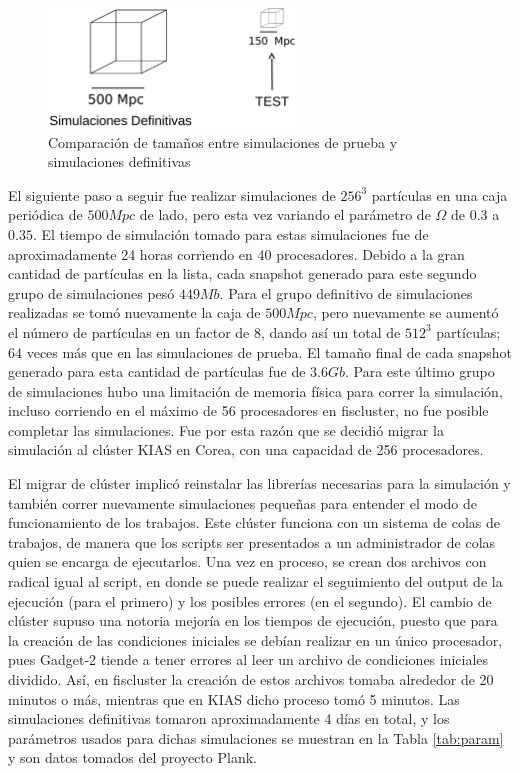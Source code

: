 \begin{figure}
	\centering
	\includegraphics[width=0.6\textwidth]{Trabajo/escala}
	\caption{Comparación de tamaños entre simulaciones de prueba y simulaciones definitivas}
	\label{fig:escala}
\end{figure}

El siguiente paso a seguir fue realizar simulaciones de $256^3$ partículas en una caja periódica de $500Mpc$ de lado, pero esta vez variando el parámetro de $\Omega$ de $0.3$ a $0.35$. El tiempo de simulación tomado para estas simulaciones fue de aproximadamente 24 horas corriendo en 40 procesadores. Debido a la gran cantidad de partículas en la lista, cada snapshot generado para este segundo grupo de simulaciones pesó $449Mb$. Para el grupo definitivo de simulaciones realizadas se tomó nuevamente la caja de $500Mpc$, pero nuevamente se aumentó el número de partículas en un factor de 8, dando así un total de $512^3$ partículas; $64$ veces más que en las simulaciones de prueba. El tamaño final de cada snapshot generado para esta cantidad de partículas fue de $3.6Gb$. Para este último grupo de simulaciones hubo una limitación de memoria física para correr la simulación, incluso corriendo en el máximo de 56 procesadores en fiscluster, no fue posible completar las simulaciones. Fue por esta razón que se decidió migrar la simulación al clúster KIAS en Corea, con una capacidad de 256 procesadores. 

El migrar de clúster implicó reinstalar las librerías necesarias para la simulación y también correr nuevamente simulaciones pequeñas para entender el modo de funcionamiento de los trabajos. Este clúster funciona con un sistema de colas de trabajos, de manera que los scripts ser presentados a un administrador de colas quien se encarga de ejecutarlos. Una vez en proceso, se crean dos archivos con radical igual al script, en donde se puede realizar el seguimiento del output de la ejecución (para el primero) y los posibles errores (en el segundo). El cambio de clúster supuso una notoria mejoría en los tiempos de ejecución, puesto que para la creación de las condiciones iniciales se debían realizar en un único procesador, pues Gadget-2 tiende a tener errores al leer un archivo de condiciones iniciales dividido. Así, en fiscluster la creación de estos archivos tomaba alrededor de 20 minutos o más, mientras que en KIAS dicho proceso tomó 5 minutos. Las simulaciones definitivas tomaron aproximadamente 4 días en total, y los parámetros usados para dichas simulaciones se muestran en la Tabla \ref{tab:param} y son datos tomados del proyecto Plank.


